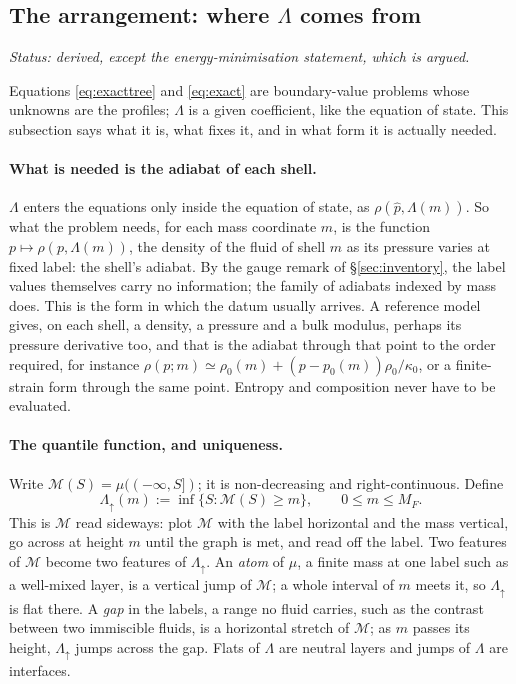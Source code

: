 \documentclass[11pt]{article}
\theoremstyle{definition}
\theoremstyle{remark}
\newcommand{\Mcdf}{\mathcal M}
\newcommand{\status}[1]{\noindent\emph{Status: #1}\par\smallskip}
\begin{document}
\subsection{The arrangement: where \texorpdfstring{$\Lambda$}{Lambda} comes from}
\label{sec:arrangement}

\status{derived, except the energy-minimisation statement, which is
argued.}

Equations \eqref{eq:exacttree} and \eqref{eq:exact} are boundary-value
problems whose unknowns are the profiles; $\Lambda$ is a given
coefficient, like the equation of state. This subsection says what it
is, what fixes it, and in what form it is actually needed.

\paragraph{What is needed is the adiabat of each shell.} $\Lambda$
enters the equations only inside the equation of state, as $\rho(\hat
p, \Lambda(m))$. So what the problem needs, for each mass coordinate
$m$, is the function $p \mapsto \rho(p, \Lambda(m))$, the density of
the fluid of shell $m$ as its pressure varies at fixed label: the
shell's adiabat. By the gauge remark of \S\ref{sec:inventory}, the
label values themselves carry no information; the family of adiabats
indexed by mass does. This is the form in which the datum usually
arrives. A reference model gives, on each shell, a density, a pressure
and a bulk modulus, perhaps its pressure derivative too, and that is
the adiabat through that point to the order required, for instance
$\rho(p; m) \simeq \rho_0(m) + (p - p_0(m))\rho_0/\kappa_0$, or a
finite-strain form through the same point. Entropy and composition
never have to be evaluated.

\paragraph{The quantile function, and uniqueness.} Write $\Mcdf(S) =
\mu((-\infty, S])$; it is non-decreasing and right-continuous. Define
\begin{equation}
  \Lambda_\uparrow(m) := \inf\{S : \Mcdf(S) \ge m\},\qquad 0 \le m \le M_F .
  \label{eq:quantile}
\end{equation}
This is $\Mcdf$ read sideways: plot $\Mcdf$ with the label horizontal and
the mass vertical, go across at height $m$ until the graph is met, and
read off the label. Two features of $\Mcdf$ become two features of
$\Lambda_\uparrow$. An \emph{atom} of $\mu$, a finite mass at one label
such as a well-mixed layer, is a vertical jump of $\Mcdf$; a whole
interval of $m$ meets it, so $\Lambda_\uparrow$ is flat there. A
\emph{gap} in the labels, a range no fluid carries, such as the
contrast between two immiscible fluids, is a horizontal stretch of
$\Mcdf$; as $m$ passes its height, $\Lambda_\uparrow$ jumps across the
gap. Flats of $\Lambda$ are neutral layers and jumps of $\Lambda$ are
interfaces.
\end{document}
